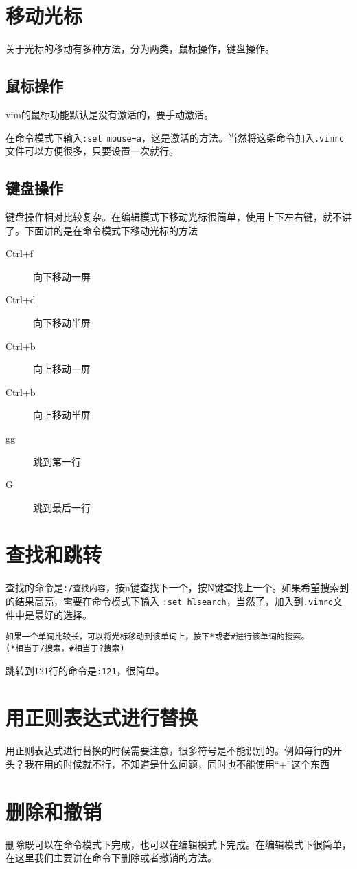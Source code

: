 \documentclass[a4paper,12pt]{ctexart}%
\begin{document}
\section{移动光标}
关于光标的移动有多种方法，分为两类，鼠标操作，键盘操作。
\subsection{鼠标操作}
vim的鼠标功能默认是没有激活的，要手动激活。

在命令模式下输入\verb|:set mouse=a|，这是激活的方法。当然将这条命令加入\verb|.vimrc|文件可以方便很多，只要设置一次就行。
\subsection{键盘操作}
键盘操作相对比较复杂。在编辑模式下移动光标很简单，使用上下左右键，就不讲了。下面讲的是在命令模式下移动光标的方法
\begin{description}
  \item[Ctrl+f] 向下移动一屏
  \item[Ctrl+d] 向下移动半屏
  \item[Ctrl+b] 向上移动一屏
  \item[Ctrl+b] 向上移动半屏
  \item[gg]     跳到第一行
  \item[G]      跳到最后一行
\end{description}

\section{查找和跳转}
查找的命令是\verb|:/查找内容|，按n键查找下一个，按N键查找上一个。如果希望搜索到的结果高亮，需要在命令模式下输入 \verb|:set hlsearch|，当然了，加入到\verb|.vimrc|文件中是最好的选择。
\begin{verbatim}
如果一个单词比较长，可以将光标移动到该单词上，按下*或者#进行该单词的搜索。
(*相当于/搜索，#相当于?搜索)
\end{verbatim}
跳转到121行的命令是\verb|:121|，很简单。

\section{用正则表达式进行替换}
用正则表达式进行替换的时候需要注意，很多符号是不能识别的。例如每行的开头？我在用的时候就不行，不知道是什么问题，同时也不能使用“+”这个东西


\section{删除和撤销}
删除既可以在命令模式下完成，也可以在编辑模式下完成。在编辑模式下很简单，在这里我们主要讲在命令下删除或者撤销的方法。
\end{document}
